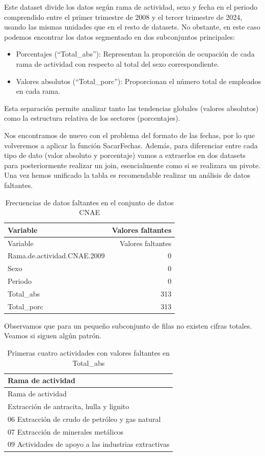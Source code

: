 \documentclass[Universitat de
València,article,submit,moreauthors,pdftex]{Definitions/mdpi}
\begin{document}
Este dataset divide los datos según rama de actividad, sexo y fecha en
el periodo comprendido entre el primer trimestre de 2008 y el tercer
trimestre de 2024, usando las mismas unidades que en el resto de
datasets. No obstante, en este caso podemos encontrar los datos
segmentado en dos subconjuntos principales:

\begin{itemize}
\item
  Porcentajes (``Total\_abs''): Representan la proporción de ocupación
  de cada rama de actividad con respecto al total del sexo
  correspondiente.
\item
  Valores absolutos (``Total\_porc''): Proporcionan el número total de
  empleados en cada rama.
\end{itemize}

Esta separación permite analizar tanto las tendencias globales (valores
absolutos) como la estructura relativa de los sectores (porcentajes).

Nos encontramos de nuevo con el problema del formato de las fechas, por
lo que volveremos a aplicar la función SacarFechas. Además, para
diferenciar entre cada tipo de dato (valor absoluto y porcentaje) vamos
a extraerlos en dos datasets para posteriormente realizar un join,
esencialmente como si se realizara un pivote. Una vez hemos unificado la
tabla es recomendable realizar un análisis de datos faltantes.

\begin{longtable}[]{@{}lr@{}}
\caption{Frecuencias de datos faltantes en el conjunto de datos
CNAE}\tabularnewline
\toprule\noalign{}
Variable & Valores faltantes \\
\midrule\noalign{}
\endfirsthead
\toprule\noalign{}
Variable & Valores faltantes \\
\midrule\noalign{}
\endhead
\bottomrule\noalign{}
\endlastfoot
Rama.de.actividad.CNAE.2009 & 0 \\
Sexo & 0 \\
Periodo & 0 \\
Total\_abs & 313 \\
Total\_porc & 313 \\
\end{longtable}

Observamos que para un pequeño subconjunto de filas no existen cifras
totales. Veamos si siguen algún patrón.

\begin{longtable}[]{@{}l@{}}
\caption{Primeras cuatro actividades con valores faltantes en
Total\_abs}\tabularnewline
\toprule\noalign{}
Rama de actividad \\
\midrule\noalign{}
\endfirsthead
\toprule\noalign{}
Rama de actividad \\
\midrule\noalign{}
\endhead
\bottomrule\noalign{}
\endlastfoot
05 Extracción de antracita, hulla y lignito \\
06 Extracción de crudo de petróleo y gas natural \\
07 Extracción de minerales metálicos \\
09 Actividades de apoyo a las industrias extractivas \\
\end{longtable}
\end{document}
